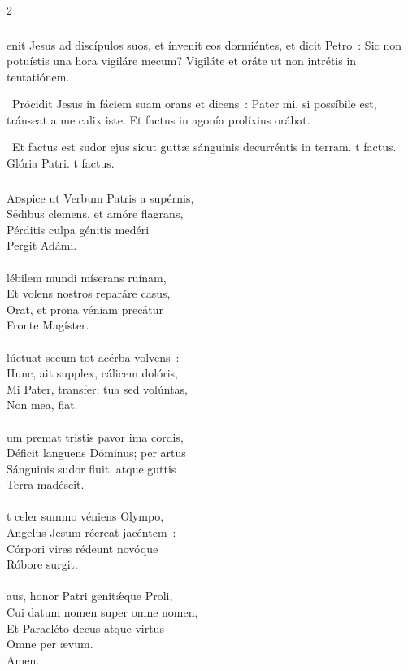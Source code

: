 \documentclass[9pt,twoside]{extarticle}
\begin{document}
\begin{multicols}{2}
\subsubsection*{}
enit Jesus ad discípulos suos, et ínvenit eos dormiéntes, et dicit Petro~: Sic non potuístis una hora vigiláre mecum? Vigiláte et oráte ut non intrétis in tentatiónem.

\begin{tightlist}{}
\item {}~Prócidit Jesus in fáciem suam orans et dicens~: Pater mi, si possíbile est, tránseat a me calix iste. \textred{*} Et factus in agonía prolíxius orábat. 
\item {}~Et factus est sudor ejus sicut guttæ sánguinis decurréntis in terram. t factus. Glória Patri. t factus. 
\end{tightlist}

\subsubsection*{\center{}}
\lettrine{A}dspice ut Verbum Patris a supérnis,\\ Sédibus clemens, et amóre flagrans,\\ Pérditis culpa génitis medéri\\ Pergit Adámi.\\
\\
lébilem mundi míserans ruínam,\\ Et volens nostros reparáre casus,\\ Orat, et prona véniam precátur\\ Fronte Magíster.\\
\\
lúctuat secum tot acérba volvens~:\\ Hunc, ait supplex, cálicem dolóris,\\ Mi Pater, transfer; tua sed volúntas,\\ Non mea, fiat.\\
\\
um premat tristis pavor ima cordis,\\ Déficit languens Dóminus; per artus\\ Sánguinis sudor fluit, atque guttis\\ Terra madéscit.\\
\\
t celer summo véniens Olympo,\\ Angelus Jesum récreat jacéntem~:\\ Córpori vires rédeunt novóque\\ Róbore surgit.\\
\\
aus, honor Patri genitǽque Proli,\\ Cui datum nomen super omne nomen,\\ Et Paracléto decus atque virtus\\ Omne per ævum.\\
Amen.


\end{multicols}
\end{document}
